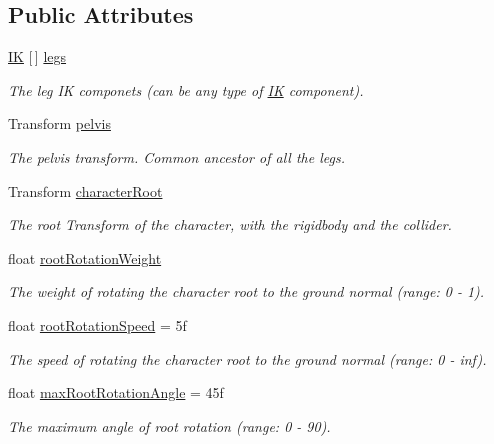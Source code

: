 \subsection*{Public Attributes}
\begin{DoxyCompactItemize}
\item 
\mbox{\hyperlink{class_root_motion_1_1_final_i_k_1_1_i_k}{IK}} \mbox{[}$\,$\mbox{]} \mbox{\hyperlink{class_root_motion_1_1_final_i_k_1_1_grounder_i_k_a177f06c63c3b6a925ee8027e0734f7ad}{legs}}
\begin{DoxyCompactList}\small\item\em The leg IK componets (can be any type of \mbox{\hyperlink{class_root_motion_1_1_final_i_k_1_1_i_k}{IK}} component). \end{DoxyCompactList}\item 
Transform \mbox{\hyperlink{class_root_motion_1_1_final_i_k_1_1_grounder_i_k_adf8e5899cf94a91d14d5e1439243db82}{pelvis}}
\begin{DoxyCompactList}\small\item\em The pelvis transform. Common ancestor of all the legs. \end{DoxyCompactList}\item 
Transform \mbox{\hyperlink{class_root_motion_1_1_final_i_k_1_1_grounder_i_k_ae1fc0528fd20ffee592ef23b401e980d}{character\+Root}}
\begin{DoxyCompactList}\small\item\em The root Transform of the character, with the rigidbody and the collider. \end{DoxyCompactList}\item 
float \mbox{\hyperlink{class_root_motion_1_1_final_i_k_1_1_grounder_i_k_a176e6eeb4faf46b2dd60b200647d121e}{root\+Rotation\+Weight}}
\begin{DoxyCompactList}\small\item\em The weight of rotating the character root to the ground normal (range\+: 0 -\/ 1). \end{DoxyCompactList}\item 
float \mbox{\hyperlink{class_root_motion_1_1_final_i_k_1_1_grounder_i_k_a896061f0128f21b00187f9c790a04ec0}{root\+Rotation\+Speed}} = 5f
\begin{DoxyCompactList}\small\item\em The speed of rotating the character root to the ground normal (range\+: 0 -\/ inf). \end{DoxyCompactList}\item 
float \mbox{\hyperlink{class_root_motion_1_1_final_i_k_1_1_grounder_i_k_a1baf8bb5d1f32f5277152351c756cbf3}{max\+Root\+Rotation\+Angle}} = 45f
\begin{DoxyCompactList}\small\item\em The maximum angle of root rotation (range\+: 0 -\/ 90). \end{DoxyCompactList}\end{DoxyCompactItemize}
